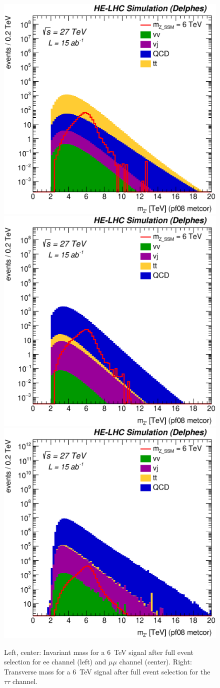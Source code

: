 \begin{figure}[h]
  \centering
  \includegraphics[width=0.30\columnwidth]{Fig/Mj1j2_pf08_MetCorr_fit_sel0_nostack_log_tt.eps}
  \includegraphics[width=0.30\columnwidth]{Fig/Mj1j2_pf08_MetCorr_fit_sel0_nostack_log_bb.eps}
  \includegraphics[width=0.30\columnwidth]{Fig/Mj1j2_pf08_MetCorr_fit_sel0_nostack_log_jj.eps}
  \caption{Left, center: Invariant mass for a 6~TeV signal after full event selection for ee channel (left) and $\mu\mu$ channel (center). Right: Transverse mass for a 6~TeV signal after full event selection for the $\tau\tau$ channel. }
  \label{figure:leptonicresonances:masses}
\end{figure}



